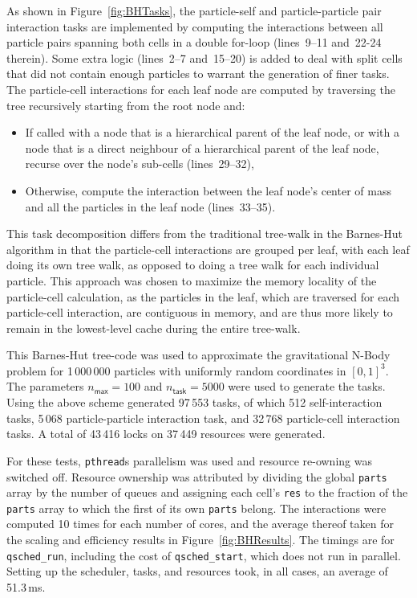 \documentclass[preprint]{elsarticle}
\newcommand{\fig}[1]
    {Figure~\ref{fig:#1}}
\begin{document}
As shown in \fig{BHTasks}, the particle-self and particle-particle pair
interaction tasks are implemented
by computing the interactions between all particle pairs spanning
both cells in a double for-loop (lines~9--11 and~22-24 therein).
Some extra logic (lines~2--7 and~15--20) is added to deal with
split cells that did not contain enough particles to warrant the
generation of finer tasks.
The particle-cell interactions for each leaf node are computed by
traversing the tree recursively starting from the root node and:
\begin{itemize}
  \item If called with a node that is a hierarchical parent of
    the leaf node, or with a node that is a direct neighbour of
    a hierarchical parent of the leaf node, recurse over the
    node's sub-cells (lines~29--32),
  \item Otherwise, compute the interaction between the leaf node's
    center of mass and all the particles in the leaf node (lines~33--35).
\end{itemize}

This task decomposition differs from the traditional tree-walk
in the Barnes-Hut algorithm in that the particle-cell interactions
are grouped per leaf, with each leaf doing its own tree walk,
as opposed to doing a tree walk for each individual particle.
This approach was chosen to maximize the memory locality
of the particle-cell calculation, as the particles in the leaf,
which are traversed for each particle-cell interaction, are
contiguous in memory, and are thus more likely to remain in the
lowest-level cache during the entire tree-walk.

This Barnes-Hut tree-code was used to approximate the gravitational
N-Body problem for 1\,000\,000 particles with uniformly random coordinates
in $[0,1]^3$.
The parameters $n_\mathsf{max}=100$ and $n_\mathsf{task}=5000$
were used to generate the tasks.
Using the above scheme generated 97\,553 tasks, of which
512 self-interaction tasks, 5\,068 particle-particle interaction
task, and 32\,768 particle-cell interaction tasks.
A total of 43\,416 locks on 37\,449 resources were generated.

For these tests, {\tt pthread}s parallelism was used and resource
re-owning was switched off.
Resource ownership was attributed by dividing the global
{\tt parts} array by the number of queues and assigning each cell's
{\tt res} to the fraction of the {\tt parts} array to which
the first of its own {\tt parts} belong.
The interactions were computed 10 times for each number of
cores, and the average thereof taken for the scaling and
efficiency results in \fig{BHResults}.
The timings are for {\tt qsched\_run}, including the cost of
{\tt qsched\_start}, which does not run in parallel.
Setting up the scheduler, tasks, and resources took, in all
cases, an average of 51.3\,ms.
\end{document}
